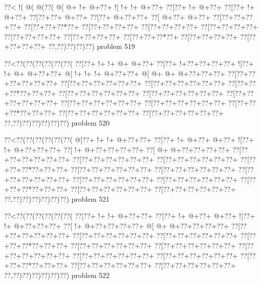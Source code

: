 \vbox{\vbox{\goo
\0??<\- !(\- @(\- @(\0??(
\- @[\- @+\- !+\- @+\0??+
\- ![\- !+\- !+\- @+\0??+
\0??[\0??+\- !+\- @+\0??+
\0??[\0??+\- !+\- @+\0??+
\0??[\0??+\0??+\- @+\0??+
\0??[\0??+\- @+\0??+\0??+
\0??[\- @+\0??+\- @+\0??+
\0??[\0??+\0??+\0??+\0??+
\0??[\0??+\0??+\0??*\0??+
\0??[\0??+\0??+\0??+\0??+
\0??[\0??+\0??+\0??+\0??+
\0??[\0??+\0??+\0??+\0??+
\0??[\0??+\0??+\0??+\0??+
\0??[\0??+\0??+\0??+\0??+
\0??[\0??+\0??+\0??*\0??+
\0??[\0??+\0??+\0??+\0??+
\0??[\0??+\0??+\0??+\0??+
\0??,\0??)\0??)\0??)\0??)
}
\hfil problem 519\hfil\break
}

\vbox{\vbox{\goo
\0??<\0??(\0??(\0??(\0??(\0??(\0??(
\0??[\0??+\- !+\- !+\- @+\- @+\0??+
\0??[\0??+\- !+\0??+\0??+\0??+\0??+
\- ![\0??+\- !+\- @+\- @+\0??+\0??+
\- @[\- !+\- !+\- !+\- @+\0??+\0??+
\- @[\- @+\- @+\- @+\0??+\0??+\0??+
\0??[\0??+\0??+\0??+\0??+\0??+\0??+
\0??[\0??+\0??+\0??+\0??+\0??+\0??+
\0??[\0??+\0??+\0??+\0??+\0??+\0??+
\0??[\0??+\0??+\0??*\0??+\0??+\0??+
\0??[\0??+\0??+\0??+\0??+\0??+\0??+
\0??[\0??+\0??+\0??+\0??+\0??+\0??+
\0??[\0??+\0??+\0??+\0??+\0??+\0??+
\0??[\0??+\0??+\0??+\0??+\0??+\0??+
\0??[\0??+\0??+\0??+\0??+\0??+\0??+
\0??[\0??+\0??+\0??*\0??+\0??+\0??+
\0??[\0??+\0??+\0??+\0??+\0??+\0??+
\0??[\0??+\0??+\0??+\0??+\0??+\0??+
\0??,\0??)\0??)\0??)\0??)\0??)\0??)
}
\hfil problem 520\hfil\break
}

\vbox{\vbox{\goo
\0??<\0??(\0??(\0??(\0??(\0??(\0??(
\- @[\0??+\- !+\- !+\- @+\0??+\0??+
\0??[\0??+\- !+\- @+\0??+\- @+\0??+
\- ![\0??+\- !+\- @+\0??+\0??+\0??+
\0??[\- !+\- @+\0??+\0??+\0??+\0??+
\0??[\- @+\- @+\0??+\0??+\0??+\0??+
\0??[\0??+\0??+\0??+\0??+\0??+\0??+
\0??[\0??+\0??+\0??+\0??+\0??+\0??+
\0??[\0??+\0??+\0??+\0??+\0??+\0??+
\0??[\0??+\0??+\0??*\0??+\0??+\0??+
\0??[\0??+\0??+\0??+\0??+\0??+\0??+
\0??[\0??+\0??+\0??+\0??+\0??+\0??+
\0??[\0??+\0??+\0??+\0??+\0??+\0??+
\0??[\0??+\0??+\0??+\0??+\0??+\0??+
\0??[\0??+\0??+\0??+\0??+\0??+\0??+
\0??[\0??+\0??+\0??*\0??+\0??+\0??+
\0??[\0??+\0??+\0??+\0??+\0??+\0??+
\0??[\0??+\0??+\0??+\0??+\0??+\0??+
\0??,\0??)\0??)\0??)\0??)\0??)\0??)
}
\hfil problem 521\hfil\break
}

\vbox{\vbox{\goo
\0??<\0??(\0??(\0??(\0??(\0??(\0??(
\0??[\0??+\- !+\- !+\- @+\0??+\0??+
\0??[\0??+\- !+\- @+\0??+\- @+\0??+
\- ![\0??+\- !+\- @+\0??+\0??+\0??+
\0??[\- !+\- @+\0??+\0??+\0??+\0??+
\- @[\- @+\- @+\0??+\0??+\0??+\0??+
\0??[\0??+\0??+\0??+\0??+\0??+\0??+
\0??[\0??+\0??+\0??+\0??+\0??+\0??+
\0??[\0??+\0??+\0??+\0??+\0??+\0??+
\0??[\0??+\0??+\0??*\0??+\0??+\0??+
\0??[\0??+\0??+\0??+\0??+\0??+\0??+
\0??[\0??+\0??+\0??+\0??+\0??+\0??+
\0??[\0??+\0??+\0??+\0??+\0??+\0??+
\0??[\0??+\0??+\0??+\0??+\0??+\0??+
\0??[\0??+\0??+\0??+\0??+\0??+\0??+
\0??[\0??+\0??+\0??*\0??+\0??+\0??+
\0??[\0??+\0??+\0??+\0??+\0??+\0??+
\0??[\0??+\0??+\0??+\0??+\0??+\0??+
\0??,\0??)\0??)\0??)\0??)\0??)\0??)
}
\hfil problem 522\hfil\break
}

